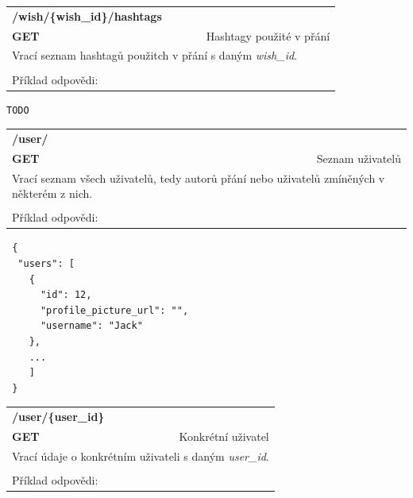 \documentclass[thesis=B,czech]{FITthesis}[2012/06/26]
\begin{document}
\begin{table}[h]
\begin{tabular}{llllr}
\rowcolor[HTML]{EFEFEF}
\large \textbf{/wish/\{wish\_id\}/hashtags}        &         &                 &        & \multicolumn{1}{l}{}                \\
\rowcolor[HTML]{EFEFEF}
\textbf{GET}          &         &                 &        & Hashtagy použité v přání                        \\
\multicolumn{5}{l}{\parbox[t]{12.8cm}{Vrací seznam hashtagů použitch v přání s daným \textit{wish\_id}.}  } \\   
 & & & & \\
 Příklad odpovědi: 
\end{tabular}
\end{table}

\begin{lstlisting}
TODO
\end{lstlisting} 

\begin{table}[h]
\begin{tabular}{llllr}
\rowcolor[HTML]{EFEFEF}
\large \textbf{/user/}        &         &                 &        & \multicolumn{1}{l}{}                \\
\rowcolor[HTML]{EFEFEF}
\textbf{GET}          &         &                 &        & Seznam uživatelů                        \\
\multicolumn{5}{l}{\parbox[t]{12.8cm}{Vrací seznam všech uživatelů, tedy autorů přání nebo uživatelů zmíněných v některém z nich. }  } \\   
 & & & & \\
 Příklad odpovědi:
\end{tabular}
\end{table}

\begin{lstlisting}
 {
  "users": [
    {
      "id": 12,
      "profile_picture_url": "",
      "username": "Jack"
    },
    ...
    ]
 }
\end{lstlisting} 

\begin{table}[h]
\begin{tabular}{llllr}
\rowcolor[HTML]{EFEFEF}
\large \textbf{/user/\{user\_id\}}        &         &                 &        & \multicolumn{1}{l}{}                \\
\rowcolor[HTML]{EFEFEF}
\textbf{GET}          &         &                 &        & Konkrétní uživatel                        \\
\multicolumn{5}{l}{\parbox[t]{12.8cm}{Vrací údaje o konkrétním uživateli s daným \textit{user\_id}. }  } \\  
 & & & & \\
 Příklad odpovědi:
\end{tabular}
\end{table}
\end{document}
